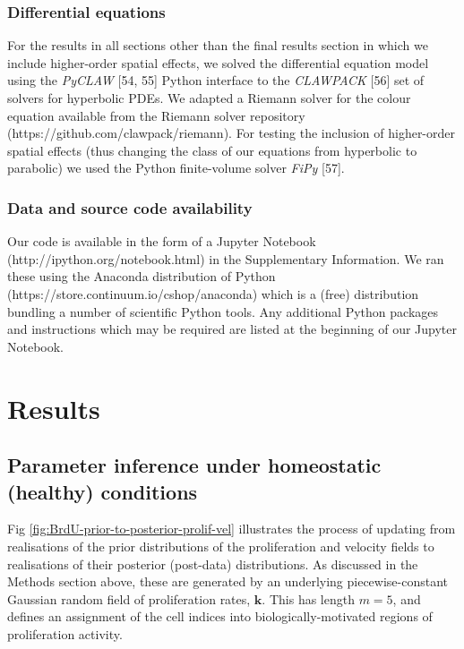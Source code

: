 \documentclass[10pt,letterpaper]{article}
\begin{document}
\subsubsection{Differential equations}\label{differential-equations}

For the results in all sections other than the final results section in
which we include higher-order spatial effects, we solved the
differential equation model using the \emph{PyCLAW} {[}54, 55{]} Python
interface to the \emph{CLAWPACK} {[}56{]} set of solvers for hyperbolic
PDEs. We adapted a Riemann solver for the colour equation available from
the Riemann solver repository (https://github.com/clawpack/riemann). For
testing the inclusion of higher-order spatial effects (thus changing the
class of our equations from hyperbolic to parabolic) we used the Python
finite-volume solver \emph{FiPy} {[}57{]}.

\subsubsection{Data and source code
availability}\label{data-and-source-code-availability}

Our code is available in the form of a Jupyter Notebook
(http://ipython.org/notebook.html) in the Supplementary Information. We
ran these using the Anaconda distribution of Python
(https://store.continuum.io/cshop/anaconda) which is a (free)
distribution bundling a number of scientific Python tools. Any
additional Python packages and instructions which may be required are
listed at the beginning of our Jupyter Notebook.

\section{Results}\label{results}

\subsection{Parameter inference under homeostatic (healthy)
conditions}\label{parameter-inference-under-homeostatic-healthy-conditions}

Fig \ref{fig:BrdU-prior-to-posterior-prolif-vel} illustrates the process
of updating from realisations of the prior distributions of the
proliferation and velocity fields to realisations of their posterior
(post-data) distributions. As discussed in the Methods section above,
these are generated by an underlying piecewise-constant Gaussian random
field of proliferation rates, \(\mathbf{k}\). This has length \(m=5\),
and defines an assignment of the cell indices into
biologically-motivated regions of proliferation activity.
\end{document}
